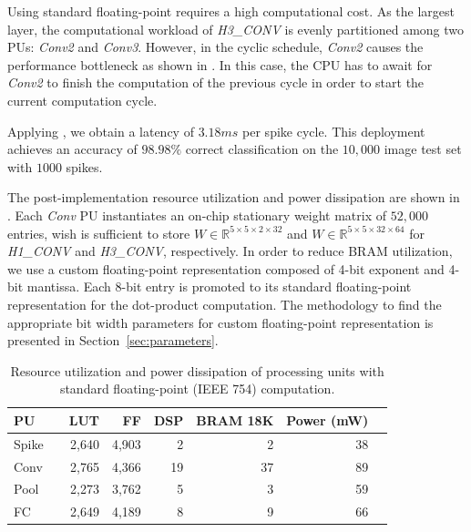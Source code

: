 Using standard floating-point requires a high computational cost. As the largest layer, the computational workload of \emph{H3\_CONV} is evenly partitioned among two PUs: \emph{Conv2} and \emph{Conv3}. However, in the cyclic schedule, \emph{Conv2} causes the performance bottleneck as shown in . In this case, the CPU has to await for \emph{Conv2} to finish the computation of the previous cycle in order to start the current computation cycle.

Applying , we obtain a latency of $3.18 ms$ per spike cycle. This deployment achieves an accuracy of $98.98\%$ correct classification on the $10,000$ image test set with $1000$ spikes.

The post-implementation resource utilization and power dissipation are shown in .  Each \emph{Conv} PU instantiates an on-chip stationary weight matrix of $52,000$ entries, wish is sufficient to store $W\in\mathbb{R}^{5\times 5\times 2\times 32}$ and $W\in\mathbb{R}^{5\times 5\times 32\times 64}$ for \emph{H1\_CONV} and \emph{H3\_CONV}, respectively. In order to reduce BRAM utilization, we use a custom floating-point representation composed of 4-bit exponent and 4-bit mantissa. Each 8-bit entry is promoted to its standard floating-point representation for the dot-product computation. The methodology to find the appropriate bit width parameters for custom floating-point representation is presented in Section~\ref{sec:parameters}.

\begin{table}[!h]\centering
	\caption{Resource utilization and power dissipation of processing units with standard floating-point (IEEE 754) computation.}\label{tab:resource_fp}
	\scriptsize
	\begin{tabular}{lrrrrrrr}\toprule
		\textbf{PU} & &\textbf{LUT} &\textbf{FF} &\textbf{DSP} &\textbf{BRAM 18K} &\textbf{Power (mW)} \\\midrule
		Spike & &2,640 &4,903 &2 &2 &38 \\
		Conv & &2,765 &4,366 &19 &37 &89 \\
		Pool & &2,273 &3,762 &5 &3 &59 \\
		FC & &2,649 &4,189 &8 &9 &66 \\
		\bottomrule
	\end{tabular}
\end{table}


